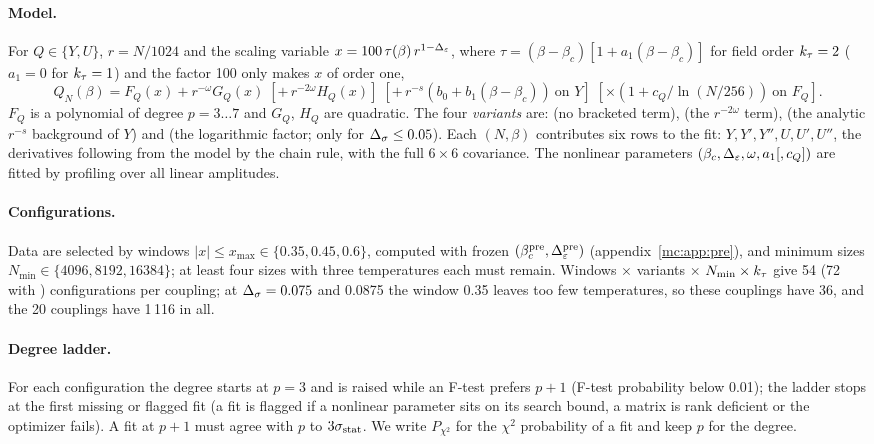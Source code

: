 \paragraph{Model.} For $Q\in\{Y,U\}$, $r=N/1024$ and the scaling variable $x=100\,\tau(\beta)\,r^{1-\Delta_\varepsilon}$, where
$\tau=(\beta-\beta_c)[1+a_1(\beta-\beta_c)]$ for field order $k_\tau=2$ ($a_1=0$ for $k_\tau=1$) and the factor 100 only makes $x$ of order one,
\begin{equation}
 Q_N(\beta)=F_Q(x)+r^{-\omega}G_Q(x)\;[+\,r^{-2\omega}H_Q(x)]\;[+\,r^{-s}(b_0+b_1(\beta-\beta_c))\ \text{on }Y]\;[\times(1+c_Q/\ln(N/256))\ \text{on }F_Q].
\end{equation}
$F_Q$ is a polynomial of degree $p=3\dots7$ and $G_Q$, $H_Q$ are quadratic. The four \emph{variants} are:  (no bracketed term),
 (the $r^{-2\omega}$ term),  (the analytic $r^{-s}$ background of $Y$) and  (the logarithmic factor;
only for $\Delta_\sigma\le0.05$). Each $(N,\beta)$ contributes six rows to the fit: $Y,Y',Y'',U,U',U''$, the derivatives following from the model by the
chain rule, with the full $6\times6$ covariance. The nonlinear parameters $(\beta_c,\Delta_\varepsilon,\omega,a_1[,c_Q])$ are fitted by profiling over all
linear amplitudes.

\paragraph{Configurations.} Data are selected by windows $|x|\le x_{\max}\in\{0.35,0.45,0.6\}$, computed with frozen $(\beta_c^{\rm
pre},\Delta_\varepsilon^{\rm pre})$ (appendix~\ref{mc:app:pre}), and minimum sizes $N_{\min}\in\{4096,8192,16384\}$; at least four sizes with three temperatures
each must remain. Windows $\times$ variants $\times$ $N_{\min}\times k_\tau$ give 54 (72 with ) configurations per coupling; at $\Delta_\sigma=0.075$ and 0.0875 the
window 0.35 leaves too few temperatures, so these couplings have 36, and the 20 couplings have 1\,116 in all.

\paragraph{Degree ladder.} For each configuration the degree starts at $p=3$ and is raised while an F-test prefers $p+1$ (F-test probability below 0.01); the ladder
stops at the first missing or flagged fit (a fit is flagged if a nonlinear parameter sits on its search bound, a matrix is rank deficient or the
optimizer fails). A fit at $p+1$ must agree with $p$ to $3\sigma_{\rm stat}$. We write $P_{\chi^2}$ for the $\chi^2$ probability of a fit and keep $p$ for
the degree.

